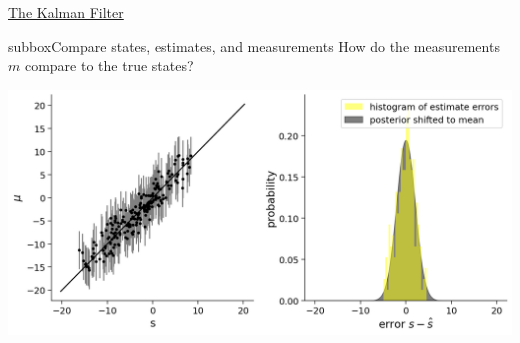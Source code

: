 \begin{textbox}{\href{http://instructor.compneuro.neuromatch.io/tutorials/W3D2_HiddenDynamics/instructor/W3D2_Tutorial3.html}{The Kalman Filter }   }
\begin{subbox}{subbox}{Compare states, estimates, and measurements}
How do the measurements $m$ compare to the true states?


\begin{center}
    
\includegraphics[scale=0.27]{Figures/HD/HD_Figure8.png}
\end{center}

\end{subbox}
\end{textbox}
